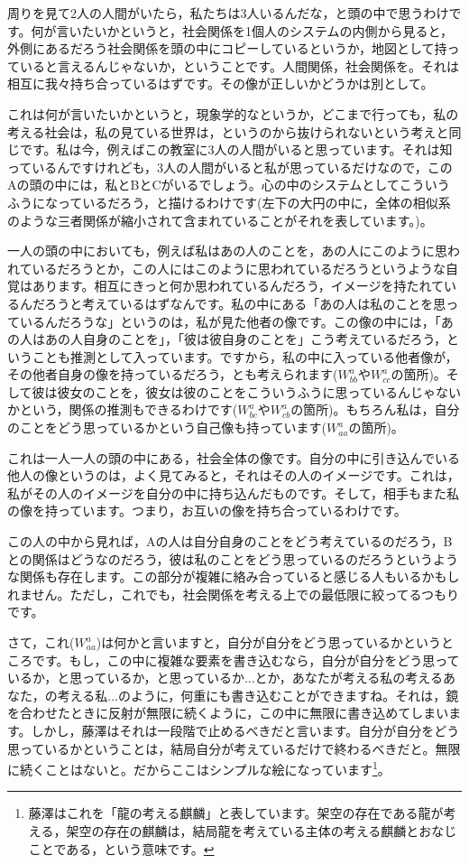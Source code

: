 \documentclass{ltjsbook}
\begin{document}
周りを見て2人の人間がいたら，私たちは3人いるんだな，と頭の中で思うわけです。何が言いたいかというと，社会関係を1個人のシステムの内側から見ると，外側にあるだろう社会関係を頭の中にコピーしているというか，地図として持っていると言えるんじゃないか，ということです。人間関係，社会関係を。それは相互に我々持ち合っているはずです。その像が正しいかどうかは別として。

これは何が言いたいかというと，現象学的なというか，どこまで行っても，私の考える社会は，私の見ている世界は，というのから抜けられないという考えと同じです。私は今，例えばこの教室に3人の人間がいると思っています。それは知っているんですけれども，3人の人間がいると私が思っているだけなので，このAの頭の中には，私とBとCがいるでしょう。心の中のシステムとしてこういうふうになっているだろう，と描けるわけです(左下の大円の中に，全体の相似系のような三者関係が縮小されて含まれていることがそれを表しています。)。

一人の頭の中においても，例えば私はあの人のことを，あの人にこのように思われているだろうとか，この人にはこのように思われているだろうというような自覚はあります。相互にきっと何か思われているんだろう，イメージを持たれているんだろうと考えているはずなんです。私の中にある「あの人は私のことを思っているんだろうな」というのは，私が見た他者の像です。この像の中には，「あの人はあの人自身のことを」，「彼は彼自身のことを」こう考えているだろう，ということも推測として入っています。ですから，私の中に入っている他者像が，その他者自身の像を持っているだろう，とも考えられます($W_{bb}^{a}$や$W_{cc}^{a}$の箇所)。そして彼は彼女のことを，彼女は彼のことをこういうふうに思っているんじゃないかという，関係の推測もできるわけです($W_{bc}^{a}$や$W_{cb}^{a}$の箇所)。もちろん私は，自分のことをどう思っているかという自己像も持っています($W_{aa}^{a}$の箇所)。

これは一人一人の頭の中にある，社会全体の像です。自分の中に引き込んでいる他人の像というのは，よく見てみると，それはその人のイメージです。これは，私がその人のイメージを自分の中に持ち込んだものです。そして，相手もまた私の像を持っています。つまり，お互いの像を持ち合っているわけです。

この人の中から見れば，Aの人は自分自身のことをどう考えているのだろう，Bとの関係はどうなのだろう，彼は私のことをどう思っているのだろうというような関係も存在します。この部分が複雑に絡み合っていると感じる人もいるかもしれません。ただし，これでも，社会関係を考える上での最低限に絞ってるつもりです。

さて，これ($W_{aa}^{a}$)は何かと言いますと，自分が自分をどう思っているかというところです。もし，この中に複雑な要素を書き込むなら，自分が自分をどう思っているか，と思っているか，と思っているか...とか，あなたが考える私の考えるあなた，の考える私...のように，何重にも書き込むことができますね。それは，鏡を合わせたときに反射が無限に続くように，この中に無限に書き込めてしまいます。しかし，藤澤はそれは一段階で止めるべきだと言います。自分が自分をどう思っているかということは，結局自分が考えているだけで終わるべきだと。無限に続くことはないと。だからここはシンプルな絵になっています\footnote{藤澤はこれを「龍の考える麒麟」と表しています。架空の存在である龍が考える，架空の存在の麒麟は，結局龍を考えている主体の考える麒麟とおなじことである，という意味です。}。
\end{document}
